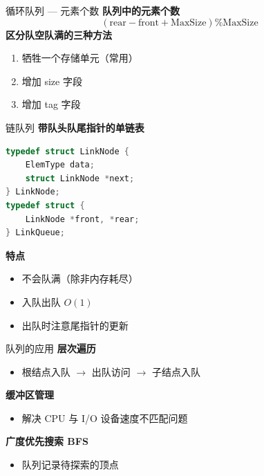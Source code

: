 \documentclass[10pt, aspectratio=169]{beamer}
\begin{document}
\begin{frame}{循环队列 --- 元素个数}
    \textbf{队列中的元素个数}
    \[
    (\text{rear} - \text{front} + \text{MaxSize}) \% \text{MaxSize}
    \]
    \vspace{0.5em}
    \textbf{区分队空队满的三种方法}
    \begin{enumerate}
        \item 牺牲一个存储单元（常用）
        \item 增加 size 字段
        \item 增加 tag 字段
    \end{enumerate}
\end{frame}

\begin{frame}[fragile]{链队列}
    \textbf{带队头队尾指针的单链表}
    \vspace{0.5em}
    \begin{lstlisting}[language=C, basicstyle=\ttfamily\small]
typedef struct LinkNode {
    ElemType data;
    struct LinkNode *next;
} LinkNode;
typedef struct {
    LinkNode *front, *rear;
} LinkQueue;
    \end{lstlisting}
    \vspace{0.3em}
    \textbf{特点}
    \begin{itemize}
        \item 不会队满（除非内存耗尽）
        \item 入队出队 $O(1)$
        \item 出队时注意尾指针的更新
    \end{itemize}
\end{frame}

\begin{frame}{队列的应用}
    \textbf{层次遍历}
    \begin{itemize}
        \item 根结点入队 $\to$ 出队访问 $\to$ 子结点入队
    \end{itemize}
    \vspace{0.3em}
    \textbf{缓冲区管理}
    \begin{itemize}
        \item 解决 CPU 与 I/O 设备速度不匹配问题
    \end{itemize}
    \vspace{0.3em}
    \textbf{广度优先搜索 BFS}
    \begin{itemize}
        \item 队列记录待探索的顶点
    \end{itemize}
\end{frame}
\end{document}
